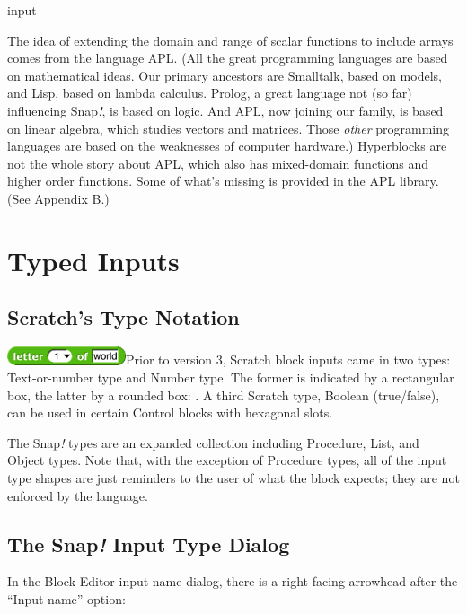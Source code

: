 input

The idea of extending the domain and range of scalar functions to
include arrays comes from the language APL. (All the great programming
languages are based on mathematical ideas. Our primary ancestors are
Smalltalk, based on models, and Lisp, based on lambda calculus. Prolog,
a great language not (so far) influencing Snap\emph{!}, is based on
logic. And APL, now joining our family, is based on linear algebra,
which studies vectors and matrices. Those \emph{other} programming
languages are based on the weaknesses of computer hardware.) Hyperblocks
are not the whole story about APL, which also has mixed-domain functions
and higher order functions. Some of what's missing is provided in the
APL library. (See Appendix B.)

\section{\texorpdfstring{\hfill\break
Typed Inputs}{ Typed Inputs}}\label{typed-inputs}

\subsection{\texorpdfstring{ Scratch's Type
Notation}{ Scratch's Type Notation}}\label{scratchs-type-notation}

\includegraphics[width=1.375in,height=0.2125in]{media/image654.png}Prior
to version 3, Scratch block inputs came in two types: Text-or-number
type and Number type. The former is indicated by a rectangular box, the
latter by a rounded box: . A third Scratch type, Boolean (true/false),
can be used in certain Control blocks with hexagonal slots.

The Snap\emph{!} types are an expanded collection including Procedure,
List, and Object types. Note that, with the exception of Procedure
types, all of the input type shapes are just reminders to the user of
what the block expects; they are not enforced by the language.

\subsection{\texorpdfstring{The Snap\emph{!} Input Type
Dialog}{The Snap! Input Type Dialog}}\label{the-snap-input-type-dialog}

In the Block Editor input name dialog, there is a right-facing arrowhead
after the ``Input name'' option:

